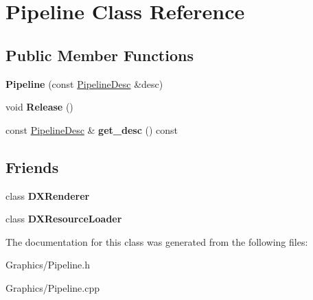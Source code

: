 \hypertarget{classPipeline}{}\section{Pipeline Class Reference}
\label{classPipeline}
\subsection*{Public Member Functions}
\begin{DoxyCompactItemize}
\item 
\mbox{\label{classPipeline_a7b6b481cd62c5c73d2600ff632bea07d}} 
{\bfseries Pipeline} (const \hyperlink{structPipelineDesc}{Pipeline\+Desc} \&desc)
\item 
\mbox{\label{classPipeline_a70ef015302a0cf5ed8750b5f89cb279a}} 
void {\bfseries Release} ()
\item 
\mbox{\label{classPipeline_a484aaaed85c2a646af5c737ca2f77469}} 
const \hyperlink{structPipelineDesc}{Pipeline\+Desc} \& {\bfseries get\+\_\+desc} () const
\end{DoxyCompactItemize}
\subsection*{Friends}
\begin{DoxyCompactItemize}
\item 
\mbox{\label{classPipeline_a14ab6f966322dccbf6597d0c82bf48c6}} 
class {\bfseries D\+X\+Renderer}
\item 
\mbox{\label{classPipeline_a871268c492209c5a9db9dc2db99f4d04}} 
class {\bfseries D\+X\+Resource\+Loader}
\end{DoxyCompactItemize}


The documentation for this class was generated from the following files\+:\begin{DoxyCompactItemize}
\item 
Graphics/Pipeline.\+h\item 
Graphics/Pipeline.\+cpp\end{DoxyCompactItemize}
